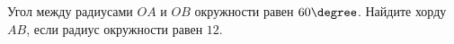 \begin{ex}
	\begin{condition}
		Угол между радиусами \( OA  \) и \( OB  \) окружности равен \( 60\degree\). Найдите хорду \( AB \), если радиус окружности равен \( 12 \).
	\end{condition}
\end{ex}